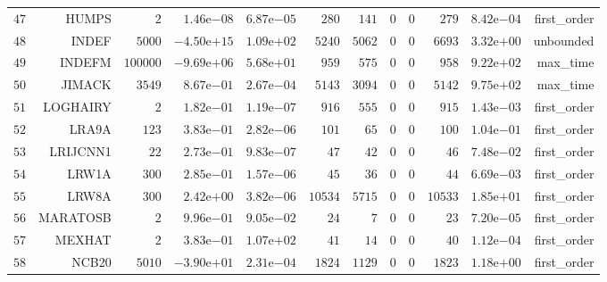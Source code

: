 \begin{longtable}{rrrrrrrrrrrr}
  \(    47\) & HUMPS & \(     2\) & \( 1.46\)e\(-08\) & \( 6.87\)e\(-05\) & \(   280\) & \(   141\) & \(     0\) & \(     0\) & \(   279\) & \( 8.42\)e\(-04\) & first\_order \\
  \(    48\) & INDEF & \(  5000\) & \(-4.50\)e\(+15\) & \( 1.09\)e\(+02\) & \(  5240\) & \(  5062\) & \(     0\) & \(     0\) & \(  6693\) & \( 3.32\)e\(+00\) & unbounded \\
  \(    49\) & INDEFM & \(100000\) & \(-9.69\)e\(+06\) & \( 5.68\)e\(+01\) & \(   959\) & \(   575\) & \(     0\) & \(     0\) & \(   958\) & \( 9.22\)e\(+02\) & max\_time \\
  \(    50\) & JIMACK & \(  3549\) & \( 8.67\)e\(-01\) & \( 2.67\)e\(-04\) & \(  5143\) & \(  3094\) & \(     0\) & \(     0\) & \(  5142\) & \( 9.75\)e\(+02\) & max\_time \\
  \(    51\) & LOGHAIRY & \(     2\) & \( 1.82\)e\(-01\) & \( 1.19\)e\(-07\) & \(   916\) & \(   555\) & \(     0\) & \(     0\) & \(   915\) & \( 1.43\)e\(-03\) & first\_order \\
  \(    52\) & LRA9A & \(   123\) & \( 3.83\)e\(-01\) & \( 2.82\)e\(-06\) & \(   101\) & \(    65\) & \(     0\) & \(     0\) & \(   100\) & \( 1.04\)e\(-01\) & first\_order \\
  \(    53\) & LRIJCNN1 & \(    22\) & \( 2.73\)e\(-01\) & \( 9.83\)e\(-07\) & \(    47\) & \(    42\) & \(     0\) & \(     0\) & \(    46\) & \( 7.48\)e\(-02\) & first\_order \\
  \(    54\) & LRW1A & \(   300\) & \( 2.85\)e\(-01\) & \( 1.57\)e\(-06\) & \(    45\) & \(    36\) & \(     0\) & \(     0\) & \(    44\) & \( 6.69\)e\(-03\) & first\_order \\
  \(    55\) & LRW8A & \(   300\) & \( 2.42\)e\(+00\) & \( 3.82\)e\(-06\) & \( 10534\) & \(  5715\) & \(     0\) & \(     0\) & \( 10533\) & \( 1.85\)e\(+01\) & first\_order \\
  \(    56\) & MARATOSB & \(     2\) & \( 9.96\)e\(-01\) & \( 9.05\)e\(-02\) & \(    24\) & \(     7\) & \(     0\) & \(     0\) & \(    23\) & \( 7.20\)e\(-05\) & first\_order \\
  \(    57\) & MEXHAT & \(     2\) & \( 3.83\)e\(-01\) & \( 1.07\)e\(+02\) & \(    41\) & \(    14\) & \(     0\) & \(     0\) & \(    40\) & \( 1.12\)e\(-04\) & first\_order \\
  \(    58\) & NCB20 & \(  5010\) & \(-3.90\)e\(+01\) & \( 2.31\)e\(-04\) & \(  1824\) & \(  1129\) & \(     0\) & \(     0\) & \(  1823\) & \( 1.18\)e\(+00\) & first\_order \\

\end{longtable}
